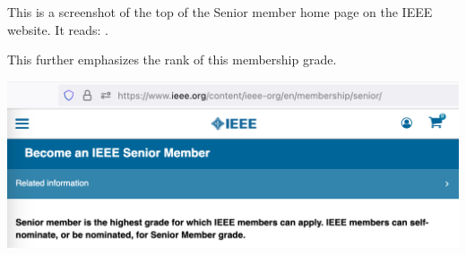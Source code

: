 
This is a screenshot of the top of the Senior member home page on the IEEE website.
It reads: .

This further emphasizes the rank of this membership grade.

\includegraphics[width=\textwidth]{senior-highest}

\pagebreak
